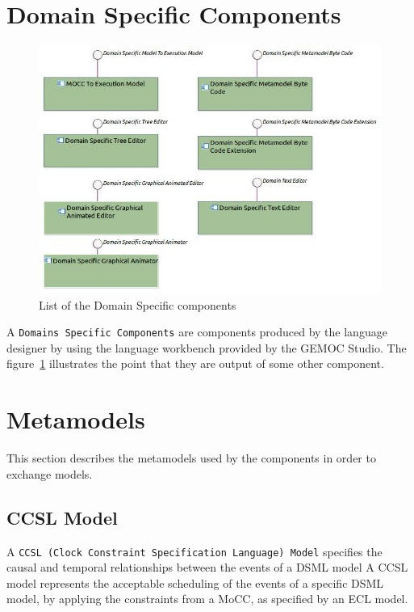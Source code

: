 \documentclass{gemoc} %
\begin{document}
\section{Domain Specific Components}
\begin{figure}[htp]
	\begin{center}
	\includegraphics*[trim=0.0cm 0.0cm 0cm 0.0cm, clip=true, width=1.0\linewidth]{../images/DomainSpecificComponents.jpg}
	\caption{List of the Domain Specific components}
	\label{fig:DomainSpecificComponentList}
	\end{center}
\end{figure}
A \texttt{Domains Specific Components} are components produced by the language designer by using the language workbench provided by the GEMOC Studio. The figure~\ref{fig:DomainSpecificComponentList} illustrates the point that they are output of some other component.
\section{Metamodels}
This section describes the metamodels used by the components in order to exchange models.
\subsection{CCSL Model}
\label{sec:CCSL_Model}
A \texttt{CCSL (Clock Constraint Specification Language) Model} specifies the causal and temporal relationships between the events of a DSML model
\newline A CCSL model represents the acceptable scheduling of the events of a specific DSML model, by applying the constraints from a MoCC, as specified by an ECL model.
\end{document}
